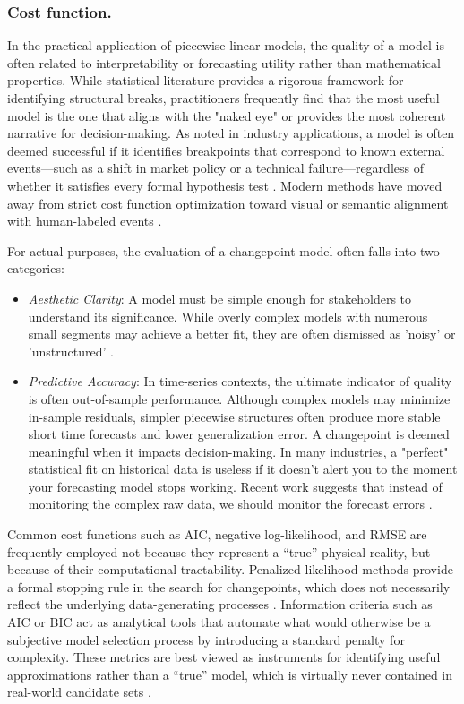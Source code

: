 \documentclass[runningheads]{llncs}
\begin{document}
\subsubsection{Cost function.}
In the practical application of piecewise linear models, the quality of a model is often related to interpretability or forecasting utility rather than mathematical properties. While statistical literature provides a rigorous framework for identifying structural breaks, practitioners frequently find that the most useful model is the one that aligns with the "naked eye" or provides the most coherent narrative for decision-making. As noted in industry applications, a model is often deemed successful if it identifies breakpoints that correspond to known external events—such as a shift in market policy or a technical failure—regardless of whether it satisfies every formal hypothesis test \cite{Datalog}. Modern methods have moved away from strict cost function optimization toward visual or semantic alignment with human-labeled events \cite{XSW25}. 

For actual purposes, the evaluation of a changepoint model often falls into two categories:
\begin{itemize}
\item{\it Aesthetic Clarity}: A model must be simple enough for stakeholders to understand its significance. While overly complex models with numerous small segments may achieve a better fit, they are often dismissed as 'noisy' or 'unstructured' \cite{GXF24}. 
\item{\it Predictive Accuracy}: In time-series contexts, the ultimate indicator of quality is often out-of-sample performance. Although complex models may minimize in-sample residuals, simpler piecewise structures often produce more stable short time forecasts and lower generalization error. A changepoint is deemed meaningful when it impacts decision-making. In many industries, a "perfect" statistical fit on historical data is useless if it doesn't alert you to the moment your forecasting model stops working. Recent work suggests that instead of monitoring the complex raw data, we should monitor the forecast errors \cite{GXF24}.
\end{itemize}

Common cost functions such as AIC, negative log-likelihood, and RMSE are frequently employed not because they represent a “true” physical reality, but because of their computational tractability. Penalized likelihood methods provide a formal stopping rule in the search for changepoints, which does not necessarily reflect the underlying data-generating processes \cite{BA02,HTF09}. Information criteria such as AIC or BIC act as analytical tools that automate what would otherwise be a subjective model selection process by introducing a standard penalty for complexity. These metrics are best viewed as instruments for identifying useful approximations rather than a “true” model, which is virtually never contained in real-world candidate sets \cite{GXF24}.
\end{document}
